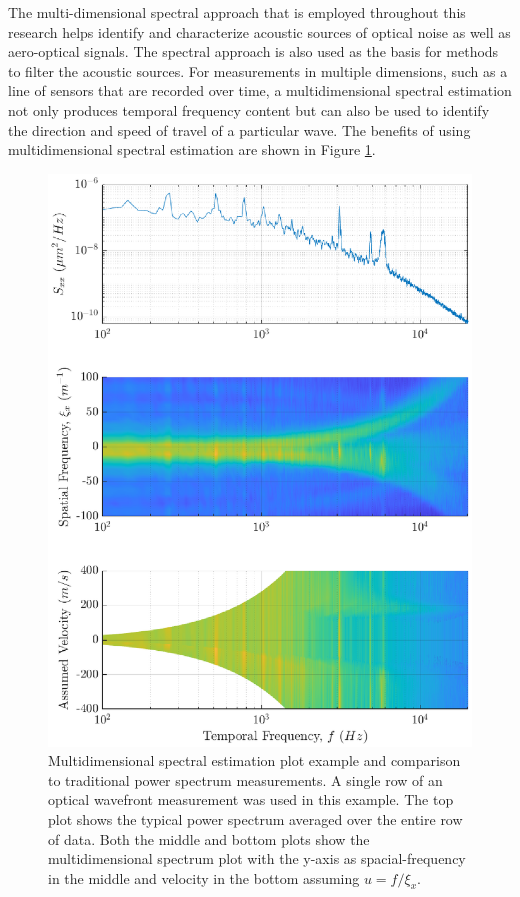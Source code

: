 The multi-dimensional spectral approach that is employed throughout this research helps identify and characterize acoustic sources of optical noise as well as aero-optical signals.
The spectral approach is also used as the basis for methods to filter the acoustic sources.
For measurements in multiple dimensions, such as a line of sensors that are recorded over time, a multidimensional spectral estimation not only produces temporal frequency content but can also be used to identify the direction and speed of travel of a particular wave.
The benefits of using multidimensional spectral estimation are shown in Figure \ref{fig:04_dispersion_demo}.
\begin{figure}
\centering
  \includegraphics{../matlab/04_dispersion_analysis/dispersion_demo.eps}
  \caption{Multidimensional spectral estimation plot example and comparison to traditional power spectrum measurements. A single row of an optical wavefront measurement was used in this example. The top plot shows the typical power spectrum averaged over the entire row of data. Both the middle and bottom plots show the multidimensional spectrum plot with the y-axis as spacial-frequency in the middle and velocity in the bottom assuming $u=f/\xi_x$.}
  \label{fig:04_dispersion_demo}
\end{figure}
